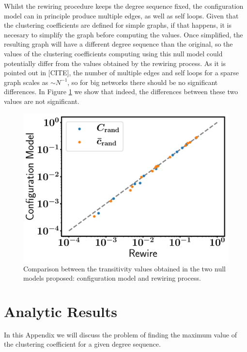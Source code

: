 \documentclass{article}
\begin{document}
Whilst the rewiring procedure keeps the degree sequence fixed, the configuration model can in principle produce multiple edges, as well as self loops. Given that the clustering coefficients are defined for simple graphs, if that happens, it is necesary to simplify the graph before computing the values. Once simplified, the resulting graph will have a different degree sequence than the original, so the values of the clustering coefficients computing using this null model could potentially differ from the values obtained by the rewiring process. As it is pointed out in [CITE], the number of multiple edges and self loops for a sparse graph scales as $\sim N^{-1}$, so for big networks there should be no significant differences. In Figure \ref{fig:CrandCM_vs_CrandRewire} we show that indeed, the differences between these two values are not significant.

\begin{figure}[ht!]
\centering
\includegraphics[scale=0.35]{./figs/CrandCM_vs_CrandRewire.pdf}
\caption{Comparison between the transitivity values obtained in the two null models proposed: configuration model and rewiring process.}
\label{fig:CrandCM_vs_CrandRewire}
\end{figure}

\section{Analytic Results}

In this Appendix we will discuss the problem of finding the maximum value of the clustering coefficient for a given degree sequence.
\end{document}
